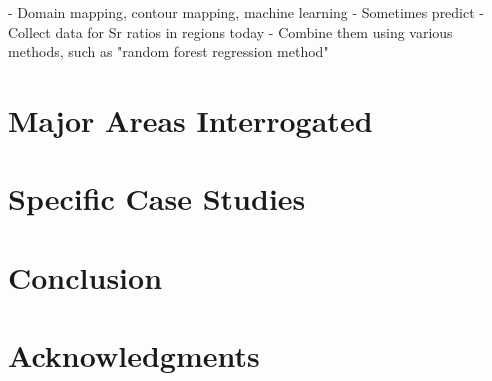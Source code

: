 \documentclass[a4paper, 12pt]{article}
\begin{document}
- Domain mapping, contour mapping, machine learning
- Sometimes predict
- Collect data for Sr ratios in regions today
- Combine them using various methods, such as "random forest regression method"


\section{Major Areas Interrogated}


\section{Specific Case Studies}



\section{Conclusion}


\section*{Acknowledgments}



\end{document}
